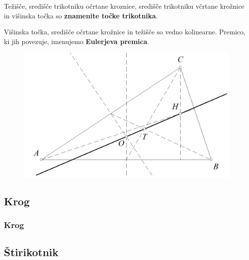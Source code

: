         \begin{frame}

            \begin{alertblock}{}
                Težišče, središče trikotniku očrtane kroznice, središče trikotniku včrtane krožnice in višinska točka so \textbf{znamenite točke trikotnika}.

            \end{alertblock}

            \begin{alertblock}{}
                Višinska točka, središče očrtane krožnice in težišče so vedno kolinearne. Premico, ki jih povezuje, imenujemo \textbf{Eulerjeva premica}.
            \end{alertblock}

            \begin{figure}
                \includegraphics[scale=0.23]{Slike in skice/Eulerjeva_premica.png}
            \end{figure}
            

        \end{frame}

    \subsection{Krog}

        \begin{frame}
            \frametitle{Krog}
        \end{frame}

    \subsection{Štirikotnik}

